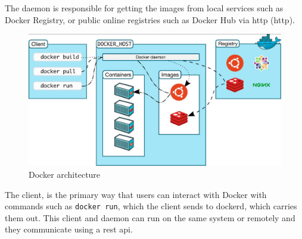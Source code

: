 The daemon is responsible for getting the images from local services such as Docker Registry, or public online registries such as Docker Hub via \acrlong{http} (\acrshort{http}).

\begin{figure}[h]
    \centering
    \includegraphics[width=1\textwidth,clip,trim=0 0 0 5]{Chapters/img/2_background/docker-architecture.jpg}
    \caption{Docker architecture~\cite{docker-overview}} 
    \label{fig:docker-architecture}
\end{figure}

The client, is the primary way that users can interact with Docker with commands such as \texttt{docker run}, which the client sends to dockerd, which carries them out. This client and daemon can run on the same system or remotely and they communicate using a \acrshort{rest} \acrshort{api}.



